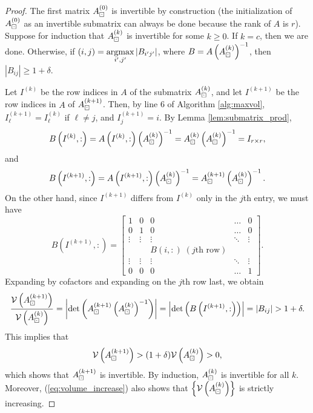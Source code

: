 \documentclass{article}
\begin{document}
	\begin{proof}
		The first matrix $A_\boxdot^{(0)}$ is invertible by construction (the initialization of $A_\boxdot^{(0)}$ as an invertible submatrix can always be done because the rank of $A$ is $r$). Suppose for induction that $A_\boxdot^{(k)}$ is invertible for some $k \ge 0$. If $k = c$, then we are done. Otherwise, if $(i,j) = \operatorname*{argmax}\limits_{i',j'}|B_{i'j'}|$, where $B = A\left(A_\boxdot^{(k)}\right)^{-1}$, then $|B_{ij}| \ge 1 + \delta$.
		
		Let $I^{(k)}$ be the row indices in $A$ of the submatrix $A_\boxdot^{(k)}$, and let $I^{(k+1)}$ be the row indices in $A$ of $A_\boxdot^{(k+1)}$. Then, by line 6 of Algorithm \ref{alg:maxvol}, $I^{(k+1)}_\ell = I^{(k)}_\ell$ if $\ell \ne j$, and $I^{(k+1)}_j = i$. By Lemma \ref{lem:submatrix_prod}, 
		\begin{equation}
			\label{eq:b_on_submat_is_identity}
			B\left(I^{(k)},:\right) = A\left(I^{(k)},:\right)\left(A_\boxdot^{(k)}\right)^{-1}=A_\boxdot^{(k)}\left(A_\boxdot^{(k)}\right)^{-1} =I_{r\times r},
		\end{equation}
		and
		\begin{equation}
			B\left(I^{(k+1)},:\right) = A\left(I^{(k+1)},:\right)\left(A_\boxdot^{(k)}\right)^{-1}=A_\boxdot^{(k+1)}\left(A_\boxdot^{(k)}\right)^{-1}.
		\end{equation}
		On the other hand, since $I^{(k+1)}$ differs from $I^{(k)}$ only in the $j$th entry, we must have
		\begin{equation}
			 B\left(I^{(k+1)},:\right) = \left[\begin{matrix}
				1 & 0 & 0&\dots & 0 \\
				0 & 1 & 0 & \dots & 0 \\
				\vdots & \vdots &\vdots & \ddots & \vdots \\
				&  & B(i, :) \;(j\text{th row})& & \\
				\vdots & \vdots &\vdots & \ddots & \vdots \\
				0 & 0 & 0 & \dots & 1
			\end{matrix}\right].
		\end{equation}
	 	Expanding by cofactors and expanding on the $j$th row last, we obtain
	 	\begin{equation}
	 		\frac{\mathcal{V}\left(A_\boxdot^{(k+1)}\right)}{\mathcal{V}\left(A_\boxdot^{(k)}\right)} = \left|\det\left(A_\boxdot^{(k+1)}\left(A_\boxdot^{(k)}\right)^{-1}\right)\right| = \left|\det\left(B\left(I^{(k+1)},:\right)\right)\right| = |B_{ij}| > 1 + \delta.
	 	\end{equation}
	 	This implies that 
	 	\begin{equation}
	 		\label{eq:volume_increase}
	 		\mathcal{V}\left(A_\boxdot^{(k+1)}\right) > (1+\delta)\mathcal{V}\left(A_\boxdot^{(k)}\right) > 0,
	 	\end{equation}
	 	which shows that $A_\boxdot^{(k+1)}$ is invertible. By induction, $A_\boxdot^{(k)}$ is invertible for all $k$. Moreover, (\ref{eq:volume_increase}) also shows that $\left\{\mathcal{V}\left(A_\boxdot^{(k)}\right)\right\}$ is strictly increasing.
	 	

\end{proof}
\end{document}
